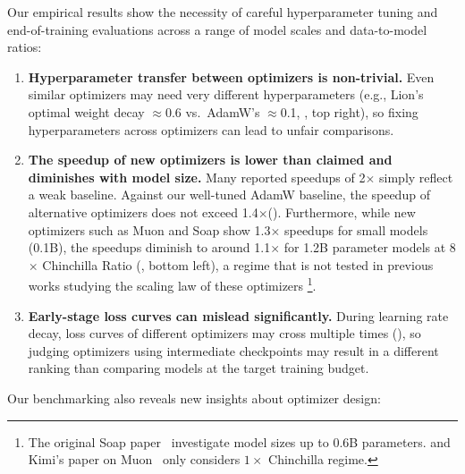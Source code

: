 Our empirical results show the necessity of careful hyperparameter tuning and end-of-training evaluations across a range of model scales and data-to-model ratios:
\begin{enumerate}
[leftmargin=*]
  \item \textbf{Hyperparameter transfer between optimizers is non-trivial.} Even similar optimizers may need very different hyperparameters (e.g., Lion's optimal weight decay $\approx$0.6 vs.\ AdamW's $\approx$0.1, , top right), so fixing hyperparameters across optimizers can lead to unfair comparisons.
    \item \textbf{The speedup of new optimizers is lower than claimed and diminishes with model size.} Many reported speedups of 2$\times$ simply reflect a weak baseline. Against our well-tuned AdamW baseline, the speedup of alternative optimizers does not exceed 1.4$\times$(). Furthermore, while new optimizers such as Muon and Soap show 1.3$\times$ speedups for small models (0.1B), the speedups diminish to around 1.1$\times$ for 1.2B parameter models at 8$\times$ Chinchilla Ratio (, bottom left), a regime that is not tested in previous works studying the scaling law of these optimizers \footnote{The original Soap paper~\cite{vyas2025soapimprovingstabilizingshampoo} investigate model sizes up to 0.6B parameters. and Kimi's paper on Muon~\cite{liu2025muonscalablellmtraining} only considers $1\times$ Chinchilla regime.}.
    \item \textbf{Early-stage loss curves can mislead significantly.} During learning rate decay, loss curves of different optimizers may cross multiple times (), so judging optimizers using intermediate checkpoints may result in a different ranking than comparing models at the target training budget.
\end{enumerate}


Our benchmarking also reveals new insights about optimizer design: 

